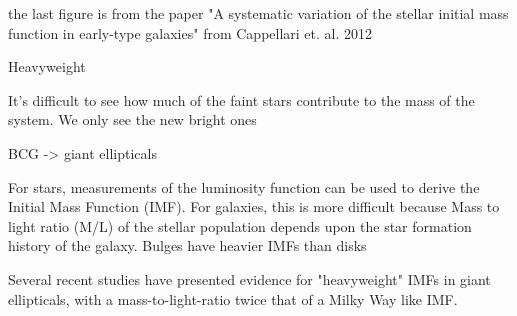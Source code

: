 the last figure is from the paper "A systematic variation of the stellar initial mass function in early-type galaxies" from Cappellari et. al. 2012

Heavyweight

It's difficult to see how much of the faint stars contribute to the mass of the system. We only see the new bright ones

BCG -> giant ellipticals

For stars, measurements of the luminosity function can be used to derive the Initial Mass Function (IMF). For galaxies, this is more difficult because Mass to light ratio (M/L) of the stellar population depends upon the star formation history of
the galaxy. Bulges have heavier IMFs than disks

Several recent studies have presented evidence for "heavyweight" IMFs in giant ellipticals, with a mass-to-light-ratio twice that of a Milky Way like IMF.
